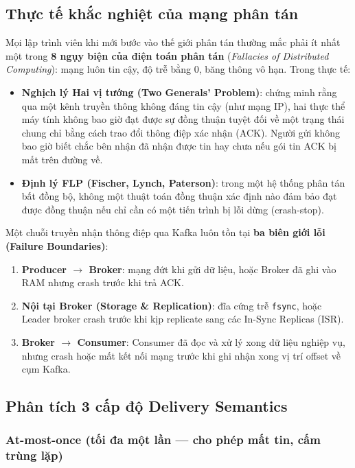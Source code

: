 \documentclass[12pt]{article}
\begin{document}
\subsection{Thực tế khắc nghiệt của mạng phân tán}

Mọi lập trình viên khi mới bước vào thế giới phân tán thường mắc phải ít nhất một trong \textbf{8 ngụy biện của điện toán phân tán} (\textit{Fallacies of Distributed Computing}): mạng luôn tin cậy, độ trễ bằng 0, băng thông vô hạn. Trong thực tế:

\begin{itemize}
    \item \textbf{Nghịch lý Hai vị tướng (Two Generals' Problem)}: chứng minh rằng qua một kênh truyền thông không đáng tin cậy (như mạng IP), hai thực thể máy tính không bao giờ đạt được sự đồng thuận tuyệt đối về một trạng thái chung chỉ bằng cách trao đổi thông điệp xác nhận (ACK). Người gửi không bao giờ biết chắc bên nhận đã nhận được tin hay chưa nếu gói tin ACK bị mất trên đường về.
    \item \textbf{Định lý FLP (Fischer, Lynch, Paterson)}: trong một hệ thống phân tán bất đồng bộ, không một thuật toán đồng thuận xác định nào đảm bảo đạt được đồng thuận nếu chỉ cần có một tiến trình bị lỗi dừng (crash-stop).
\end{itemize}

Một chuỗi truyền nhận thông điệp qua Kafka luôn tồn tại \textbf{ba biên giới lỗi (Failure Boundaries)}:
\begin{enumerate}
    \item \textbf{Producer $\rightarrow$ Broker}: mạng đứt khi gửi dữ liệu, hoặc Broker đã ghi vào RAM nhưng crash trước khi trả ACK.
    \item \textbf{Nội tại Broker (Storage \& Replication)}: đĩa cứng trễ \texttt{fsync}, hoặc Leader broker crash trước khi kịp replicate sang các In-Sync Replicas (ISR).
    \item \textbf{Broker $\rightarrow$ Consumer}: Consumer đã đọc và xử lý xong dữ liệu nghiệp vụ, nhưng crash hoặc mất kết nối mạng trước khi ghi nhận xong vị trí offset về cụm Kafka.
\end{enumerate}

\subsection{Phân tích 3 cấp độ Delivery Semantics}

\subsubsection{At-most-once (tối đa một lần --- cho phép mất tin, cấm trùng lặp)}
\end{document}
